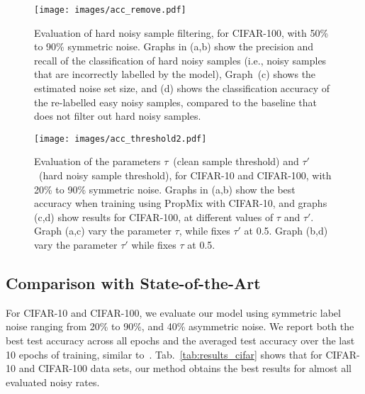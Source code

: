 \documentclass{bmvc2k}
\begin{document}
 


\begin{figure}[!ht]
\centering
\texttt{[image: images/acc\_remove.pdf]}
\caption{Evaluation of hard noisy sample filtering, for CIFAR-100, with 50\% to 90\% symmetric noise. Graphs in (a,b) show the precision and recall of the classification of hard noisy samples (i.e., noisy samples that are incorrectly labelled by the model), Graph~(c) shows the estimated noise set size, and (d) shows the classification accuracy of the re-labelled easy noisy samples, compared to the baseline that does not filter out hard noisy samples.}
\label{fig:noisy_pred}
\end{figure}






\begin{figure}[!ht]
\centering
\texttt{[image: images/acc\_threshold2.pdf]}
\caption{Evaluation of the parameters $\tau$~(clean sample threshold) and $\tau'$~(hard noisy sample threshold), for CIFAR-10 and CIFAR-100, with 20\% to 90\% symmetric noise. Graphs in (a,b) show the best accuracy when training using PropMix with CIFAR-10, and graphs (c,d) show results for CIFAR-100, at different values of $\tau$ and $\tau'$. Graph (a,c) vary the parameter $\tau$, while fixes $\tau'$ at 0.5. Graph (b,d) vary the parameter $\tau'$ while fixes $\tau$ at 0.5.}
\label{fig:th}
\end{figure}

\vspace{-.1in}
\subsection{Comparison with State-of-the-Art}

For CIFAR-10 and CIFAR-100, we evaluate our model using symmetric label noise ranging from 20\% to 90\%, and 40\% asymmetric noise. 
We report both the best test accuracy across all epochs and the averaged test accuracy over the last 10 epochs of training, similar to~\citep{DivideMix}. Tab.~\ref{tab:results_cifar} shows that for CIFAR-10 and CIFAR-100 data sets, our method obtains the best results for almost all evaluated noisy rates.
\end{document}
